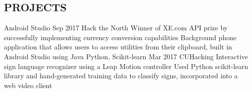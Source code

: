\documentclass{aanguyen_res}
\begin{document}
\begin{main}
    \section{PROJECTS}
      \begin{entrylist}
        \rightentry%
          {Android Studio}%
          {\href{https://github.com/kumailn/clipBuddy}{}}%
          {Sep 2017}%
          {Hack the North}%
          {\createlist%
            {%
              Winner of XE.com API prize by successfully implementing currency conversion %
              capabilities %
            }%
            {%
               Background phone application that allows users to access utilities from their clipboard, %
               built in Android Studio using Java%
            }%
          }
        \rightentry%
          {Python, Scikit-learn}%
          {\href{https://github.com/aanguyen/SignBuddy}{}}%
          {Mar 2017}%
          {CUHacking}%
          {\createlist%
            {%
              Interactive sign language recognizer using a Leap Motion controller %
            }%
            {%
              Used Python scikit-learn library and hand-generated training data to classify signs, %
              incorporated into a web video client %
            }%
          }
      \end{entrylist}
  \end{main}
\end{document}
